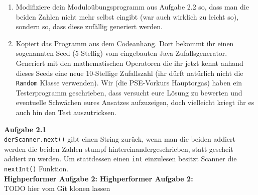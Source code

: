 \documentclass{../../sheet}
\begin{document}
\begin{enumerate}
    \item Modifiziere dein Moduloübungsprogramm aus Aufgabe 2.2 so, dass man die beiden Zahlen nicht mehr selbst eingibt (war auch wirklich zu leicht so), sondern so, dass diese zufällig generiert werden.
    \item Kopiert das Programm aus dem \hyperlink{Aufgabe_2.2}{Codeanhang}. Dort bekommt ihr einen sogenannten Seed (5-Stellig) vom eingebauten Java Zufallsgenerator. Generiert mit den mathematischen Operatoren die ihr jetzt kennt anhand dieses Seeds eine neue 10-Stellige Zufallszahl (ihr dürft natürlich nicht die \texttt{Random} Klasse verwenden). Wir (die PSE-Vorkurs Hauptorgas) haben ein Testerprogramm geschrieben, dass versucht eure Lösung zu bewerten und eventuelle Schwächen eures Ansatzes aufzuzeigen, doch vielleicht kriegt ihr es auch hin den Test auszutricksen.
\end{enumerate}

\newpage
{}
\hypertarget{Aufgabe_2.1}{}
\textbf{Aufgabe 2.1}\\
\texttt{derScanner.next()} gibt einen String zurück, wenn man die beiden addiert werden die beiden Zahlen stumpf hintereinandergeschrieben, statt gescheit addiert zu werden. Um stattdessen einen \texttt{int} einzulesen besitzt Scanner die \texttt{nextInt()} Funktion.\\
\textbf{Highperformer Aufgabe 2:}
\hypertarget{Aufgabe_2.2}{}
\textbf{Highperformer Aufgabe 2:}
\\TODO hier vom Git klonen lassen
\end{document}
